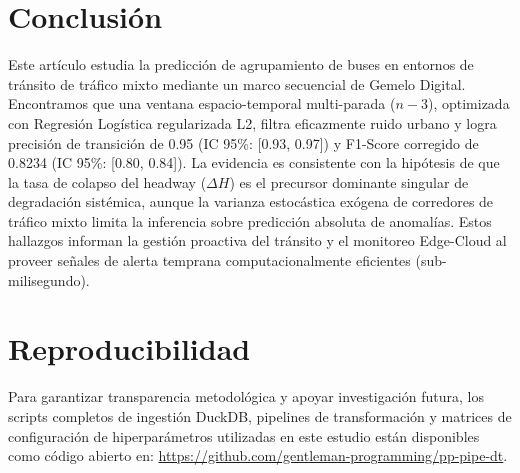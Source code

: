 \documentclass[journal,twocolumn]{IEEEtran}
\begin{document}
\section{Conclusión}
Este artículo estudia la predicción de agrupamiento de buses en entornos de tránsito de tráfico mixto mediante un marco secuencial de Gemelo Digital. Encontramos que una ventana espacio-temporal multi-parada ($n-3$), optimizada con Regresión Logística regularizada L2, filtra eficazmente ruido urbano y logra precisión de transición de 0.95 (IC 95\%: [0.93, 0.97]) y F1-Score corregido de 0.8234 (IC 95\%: [0.80, 0.84]). La evidencia es consistente con la hipótesis de que la tasa de colapso del headway ($\Delta H$) es el precursor dominante singular de degradación sistémica, aunque la varianza estocástica exógena de corredores de tráfico mixto limita la inferencia sobre predicción absoluta de anomalías. Estos hallazgos informan la gestión proactiva del tránsito y el monitoreo Edge-Cloud al proveer señales de alerta temprana computacionalmente eficientes (sub-milisegundo).

\section*{Reproducibilidad}
Para garantizar transparencia metodológica y apoyar investigación futura, los scripts completos de ingestión DuckDB, pipelines de transformación y matrices de configuración de hiperparámetros utilizadas en este estudio están disponibles como código abierto en: \url{https://github.com/gentleman-programming/pp-pipe-dt}.
\end{document}
